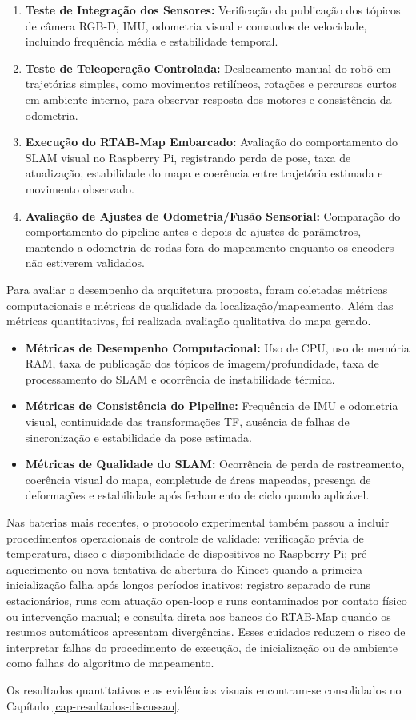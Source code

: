 \begin{enumerate}
    \item \textbf{Teste de Integração dos Sensores:} Verificação da publicação dos tópicos de câmera RGB-D, IMU, odometria visual e comandos de velocidade, incluindo frequência média e estabilidade temporal.

    \item \textbf{Teste de Teleoperação Controlada:} Deslocamento manual do robô em trajetórias simples, como movimentos retilíneos, rotações e percursos curtos em ambiente interno, para observar resposta dos motores e consistência da odometria.
    
    \item \textbf{Execução do RTAB-Map Embarcado:} Avaliação do comportamento do SLAM visual no Raspberry Pi, registrando perda de pose, taxa de atualização, estabilidade do mapa e coerência entre trajetória estimada e movimento observado.

    \item \textbf{Avaliação de Ajustes de Odometria/Fusão Sensorial:} Comparação do comportamento do pipeline antes e depois de ajustes de parâmetros, mantendo a odometria de rodas fora do mapeamento enquanto os encoders não estiverem validados.
\end{enumerate}

Para avaliar o desempenho da arquitetura proposta, foram coletadas métricas computacionais e métricas de qualidade da localização/mapeamento. Além das métricas quantitativas, foi realizada avaliação qualitativa do mapa gerado.

\begin{itemize}
    \item \textbf{Métricas de Desempenho Computacional:} Uso de CPU, uso de memória RAM, taxa de publicação dos tópicos de imagem/profundidade, taxa de processamento do SLAM e ocorrência de instabilidade térmica.
    \item \textbf{Métricas de Consistência do Pipeline:} Frequência de IMU e odometria visual, continuidade das transformações TF, ausência de falhas de sincronização e estabilidade da pose estimada.
    \item \textbf{Métricas de Qualidade do SLAM:} Ocorrência de perda de rastreamento, coerência visual do mapa, completude de áreas mapeadas, presença de deformações e estabilidade após fechamento de ciclo quando aplicável.
\end{itemize}

Nas baterias mais recentes, o protocolo experimental também passou a incluir procedimentos operacionais de controle de validade: verificação prévia de temperatura, disco e disponibilidade de dispositivos no Raspberry Pi; pré-aquecimento ou nova tentativa de abertura do Kinect quando a primeira inicialização falha após longos períodos inativos; registro separado de runs estacionários, runs com atuação open-loop e runs contaminados por contato físico ou intervenção manual; e consulta direta aos bancos do RTAB-Map quando os resumos automáticos apresentam divergências. Esses cuidados reduzem o risco de interpretar falhas do procedimento de execução, de inicialização ou de ambiente como falhas do algoritmo de mapeamento.

Os resultados quantitativos e as evidências visuais encontram-se consolidados no Capítulo \ref{cap-resultados-discussao}.
